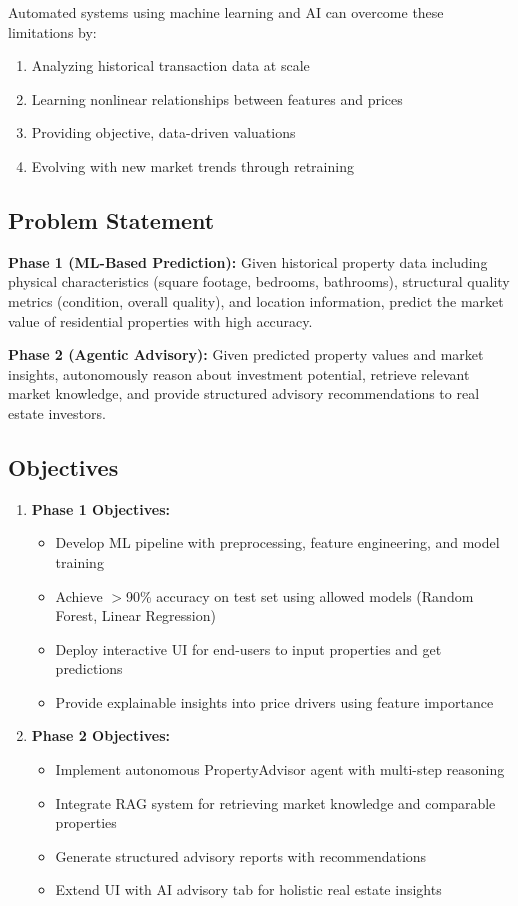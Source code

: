\documentclass[11pt,a4paper]{article}
\begin{document}
Automated systems using machine learning and AI can overcome these limitations by:
\begin{enumerate}
    \item Analyzing historical transaction data at scale
    \item Learning nonlinear relationships between features and prices
    \item Providing objective, data-driven valuations
    \item Evolving with new market trends through retraining
\end{enumerate}

\subsection{Problem Statement}

\textbf{Phase 1 (ML-Based Prediction):} Given historical property data including physical characteristics (square footage, bedrooms, bathrooms), structural quality metrics (condition, overall quality), and location information, predict the market value of residential properties with high accuracy.

\textbf{Phase 2 (Agentic Advisory):} Given predicted property values and market insights, autonomously reason about investment potential, retrieve relevant market knowledge, and provide structured advisory recommendations to real estate investors.

\subsection{Objectives}

\begin{enumerate}
    \item \textbf{Phase 1 Objectives:}
    \begin{itemize}
        \item Develop ML pipeline with preprocessing, feature engineering, and model training
        \item Achieve $>$90\% accuracy on test set using allowed models (Random Forest, Linear Regression)
        \item Deploy interactive UI for end-users to input properties and get predictions
        \item Provide explainable insights into price drivers using feature importance
    \end{itemize}
    
    \item \textbf{Phase 2 Objectives:}
    \begin{itemize}
        \item Implement autonomous PropertyAdvisor agent with multi-step reasoning
        \item Integrate RAG system for retrieving market knowledge and comparable properties
        \item Generate structured advisory reports with recommendations
        \item Extend UI with AI advisory tab for holistic real estate insights
    \end{itemize}
\end{enumerate}
\end{document}
